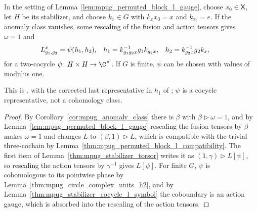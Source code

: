\begin{lemma}
    \label{lem:mpug_permuted_block_stabilizer_form}
    \leanok
    In the setting of Lemma~\ref{lem:mpug_permuted_block_l_gauge}, choose
    $x_0\in\mathsf X$, let $H$ be its stabilizer, and choose $k_x\in G$ with
    $k_xx_0=x$ and $k_{x_0}=e$. If the anomaly class vanishes, some rescaling
    of the fusion and action tensors gives $\omega=1$ and
    \begin{align}
        L^x_{g_1,g_2}
         & =\psi(h_1,h_2),
         &
        h_1
         & =k_{g_1g_2x}^{-1}g_1k_{g_2x},
         &
        h_2
         & =k_{g_2x}^{-1}g_2k_x,
        \notag
    \end{align}
    for a two-cocycle $\psi\colon H\times H\to\C^\times$. If $G$ is finite,
    $\psi$ can be chosen with values of modulus one.

    This is \cite[lines~7028--7042]{FrancoRubio2025MPUGauging}, with the
    corrected last representative in $h_1$ of
    \cite{gap:fbc25_stabilizer_transition_index_typo}; $\psi$ is a cocycle
    representative, not a cohomology class.
\end{lemma}

\begin{proof}\leanok
    By Corollary~\ref{cor:mpug_anomaly_class} there is $\beta$ with
    $\beta\mathbin{\triangleright}\omega=1$, and by
    Lemma~\ref{lem:mpug_permuted_block_l_gauge} rescaling the fusion tensors
    by $\beta$ makes $\omega=1$ and changes $L$ to
    $(\beta,1)\mathbin{\triangleright}L$, which is compatible with the
    trivial three-cochain by
    Lemma~\ref{thm:mpug_permuted_block_l_compatibility}. The first item of
    Lemma~\ref{thm:mpug_stabilizer_torsor} writes it as
    $(1,\gamma)\mathbin{\triangleright}L[\psi]$, so rescaling the action
    tensors by $\gamma^{-1}$ gives $L[\psi]$. For finite $G$, $\psi$ is
    cohomologous to its pointwise phase by
    Lemma~\ref{thm:mpug_circle_complex_units_h2}, and by
    Lemma~\ref{thm:mpug_stabilizer_cocycle_l_symbol} the coboundary is an
    action gauge, which is absorbed into the rescaling of the action tensors.
\end{proof}

